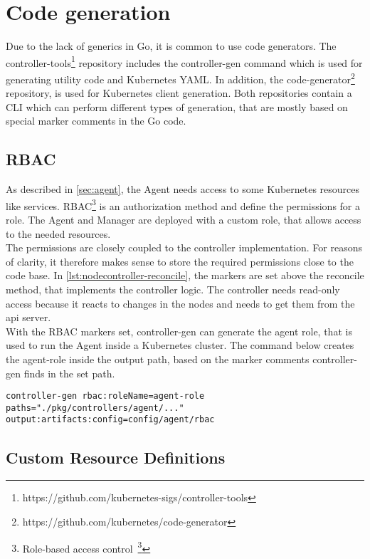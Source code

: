 \section{Code generation}\label{sec:code-generator}

Due to the lack of generics in Go, it is common to use code generators.
The controller-tools\footnote{https://github.com/kubernetes-sigs/controller-tools} repository includes the controller-gen command which is used for generating utility code and Kubernetes YAML.
In addition, the code-generator\footnote{https://github.com/kubernetes/code-generator} repository, is used for Kubernetes client generation.
Both repositories contain a CLI which can perform different types of generation, that are mostly based on special marker comments in the Go code.

\subsection{RBAC}

As described in \autoref{sec:agent}, the Agent needs access to some Kubernetes resources like services.
RBAC\footnote{Role-based access control~\footcite{RBAC}} is an authorization method and define the permissions for a role.
The Agent and Manager are deployed with a custom role, that allows access to the needed resources.
\\
The permissions are closely coupled to the controller implementation.
For reasons of clarity, it therefore makes sense to store the required permissions close to the code base.
In \autoref{lst:nodecontroller-reconcile}, the markers are set above the reconcile method, that implements the controller logic.
The controller needs read-only access because it reacts to changes in the nodes and needs to get them from the api server.
\\
With the RBAC markers set, controller-gen can generate the agent role, that is used to run the Agent inside a Kubernetes cluster.
The command below creates the agent-role inside the output path, based on the marker comments controller-gen finds in the set path.
\\
\begin{lstlisting}[numbers=none, caption={Generate Role YAML files with controller-gen}, label={lst:role-generation}]
controller-gen rbac:roleName=agent-role paths="./pkg/controllers/agent/..." output:artifacts:config=config/agent/rbac
\end{lstlisting}

\subsection{Custom Resource Definitions}

